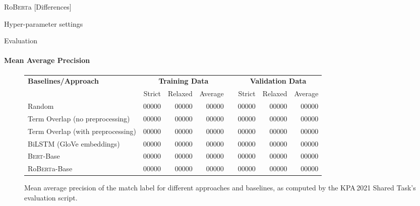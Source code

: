 \documentclass[english,handout]{mlutalk}
\newcommand{\Bert}{\textsc{Bert}\xspace}
\newcommand{\BertBase}{\Bert-Base\xspace}
\newcommand{\Roberta}{\mbox{Ro\textsc{Bert}a}\xspace}
\newcommand{\RobertaBase}{\Roberta-Base\xspace}
\newcommand{\todo}[1]{{\smaller\color{red}[#1]}}
\begin{document}
\begin{frame}{\Roberta}
  \todo{Differences}

  \begin{block}{Hyper-parameter settings}
    
  \end{block}
\end{frame}

\begin{frame}{Evaluation}
  \framesubtitle{Mean Average Precision}
  \begin{figure}
    \centering
    \caption{Mean average precision of the match label for different approaches and baselines, as computed by the KPA\,2021 Shared Task's evaluation script.}
    \tiny
    \begin{tabular}{lrrrlrrr}
      \toprule
      \textbf{Baselines/Approach} & \multicolumn{3}{c}{\textbf{Training Data}} & & \multicolumn{3}{c}{\textbf{Validation Data}}\\ \cmidrule{2-4} \cmidrule{6-8}
        & Strict & Relaxed & Average & & Strict & Relaxed & Average\\
      \midrule
      Random 
      & 00000 & 00000 & 00000 & & 00000 & 00000 & 00000 \\
      Term Overlap (no preprocessing)
      & 00000 & 00000 & 00000 & & 00000 & 00000 & 00000 \\
      Term Overlap (with preprocessing)
      & 00000 & 00000 & 00000 & & 00000 & 00000 & 00000 \\
      \midrule
      BiLSTM (GloVe embeddings)
      & 00000 & 00000 & 00000 & & 00000 & 00000 & 00000 \\
      \BertBase
      & 00000 & 00000 & 00000 & & 00000 & 00000 & 00000 \\
      \RobertaBase
      & 00000 & 00000 & 00000 & & 00000 & 00000 & 00000 \\
      \bottomrule
    \end{tabular}
  \end{figure}
\end{frame}
\end{document}
